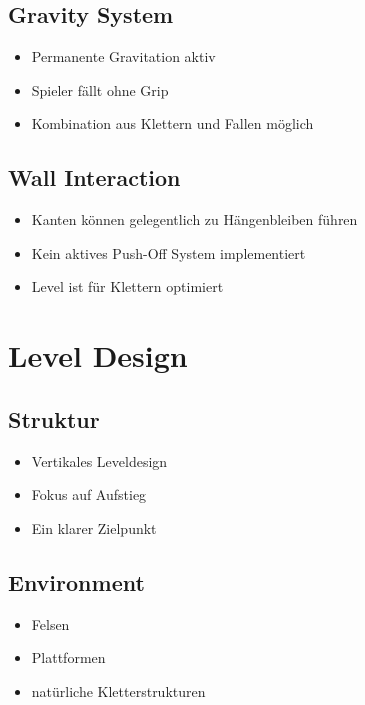 \documentclass[11pt,a4paper]{article}
\begin{document}
\subsection{Gravity System}

\begin{itemize}
    \item Permanente Gravitation aktiv
    \item Spieler fällt ohne Grip
    \item Kombination aus Klettern und Fallen möglich
\end{itemize}

\subsection{Wall Interaction}

\begin{itemize}
    \item Kanten können gelegentlich zu Hängenbleiben führen
    \item Kein aktives Push-Off System implementiert
    \item Level ist für Klettern optimiert
\end{itemize}

\section{Level Design}

\subsection{Struktur}

\begin{itemize}
    \item Vertikales Leveldesign
    \item Fokus auf Aufstieg
    \item Ein klarer Zielpunkt
\end{itemize}

\subsection{Environment}

\begin{itemize}
    \item Felsen
    \item Plattformen
    \item natürliche Kletterstrukturen
\end{itemize}
\end{document}
